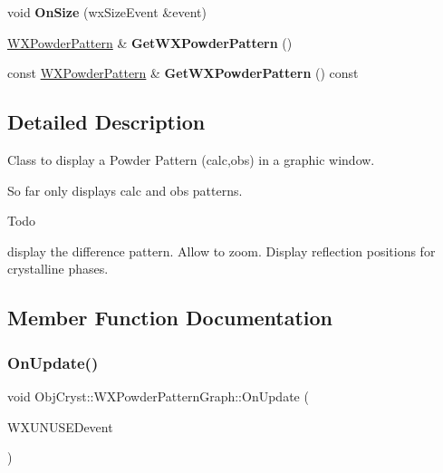 \begin{DoxyCompactItemize}
void {\bfseries On\+Size} (wx\+Size\+Event \&event)
\item 
\mbox{\label{class_obj_cryst_1_1_w_x_powder_pattern_graph_a7dd3ff915ddd8a91addac9da7c0807c8}} 
\mbox{\hyperlink{class_obj_cryst_1_1_w_x_powder_pattern}{W\+X\+Powder\+Pattern}} \& {\bfseries Get\+W\+X\+Powder\+Pattern} ()
\item 
\mbox{\label{class_obj_cryst_1_1_w_x_powder_pattern_graph_a44d18896da5b78521ada0f694b71249f}} 
const \mbox{\hyperlink{class_obj_cryst_1_1_w_x_powder_pattern}{W\+X\+Powder\+Pattern}} \& {\bfseries Get\+W\+X\+Powder\+Pattern} () const
\end{DoxyCompactItemize}


\subsection{Detailed Description}
Class to display a Powder Pattern (calc,obs) in a graphic window.

So far only displays calc and obs patterns. \begin{DoxyRefDesc}{Todo}
\item[\mbox{\hyperlink{todo__todo000002}{Todo}}]display the difference pattern. Allow to zoom. Display reflection positions for crystalline phases. \end{DoxyRefDesc}


\subsection{Member Function Documentation}
\mbox{\label{class_obj_cryst_1_1_w_x_powder_pattern_graph_a89fe469c2774080b89e5fe43ded2e412}} 
\subsubsection{\texorpdfstring{OnUpdate()}{OnUpdate()}}
{\footnotesize\ttfamily void Obj\+Cryst\+::\+W\+X\+Powder\+Pattern\+Graph\+::\+On\+Update (\begin{DoxyParamCaption}\item[{wx\+Command\+Event \&}]{W\+X\+U\+N\+U\+S\+EDevent }\end{DoxyParamCaption})}

